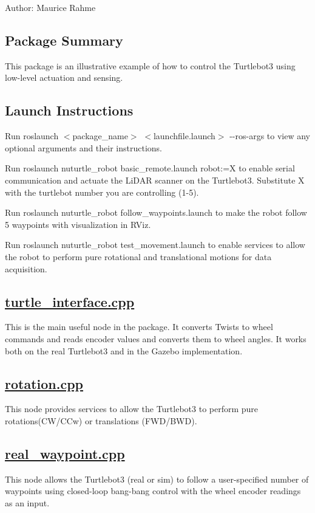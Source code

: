 Author\+: Maurice Rahme

\subsection*{Package Summary}

This package is an illustrative example of how to control the Turtlebot3 using low-\/level actuation and sensing.





\subsection*{Launch Instructions}

Run {\ttfamily roslaunch $<$package\+\_\+name$>$ $<$launchfile.\+launch$>$ -\/-\/ros-\/args} to view any optional arguments and their instructions.

Run {\ttfamily roslaunch nuturtle\+\_\+robot basic\+\_\+remote.\+launch robot\+:=X} to enable serial communication and actuate the Li\+D\+AR scanner on the Turtlebot3. Substitute {\ttfamily X} with the turtlebot number you are controlling (1-\/5).

Run {\ttfamily roslaunch nuturtle\+\_\+robot follow\+\_\+waypoints.\+launch} to make the robot follow 5 waypoints with visualization in R\+Viz.

Run {\ttfamily roslaunch nuturtle\+\_\+robot test\+\_\+movement.\+launch} to enable services to allow the robot to perform pure rotational and translational motions for data acquisition.

\subsection*{\hyperlink{turtle__interface_8cpp}{turtle\+\_\+interface.\+cpp}}

This is the main useful node in the package. It converts Twists to wheel commands and reads encoder values and converts them to wheel angles. It works both on the real Turtlebot3 and in the Gazebo implementation.

\subsection*{\hyperlink{rotation_8cpp}{rotation.\+cpp}}

This node provides services to allow the Turtlebot3 to perform pure rotations(C\+W/\+C\+Cw) or translations (F\+W\+D/\+B\+WD).

\subsection*{\hyperlink{real__waypoint_8cpp}{real\+\_\+waypoint.\+cpp}}

This node allows the Turtlebot3 (real or sim) to follow a user-\/specified number of waypoints using closed-\/loop bang-\/bang control with the wheel encoder readings as an input. 